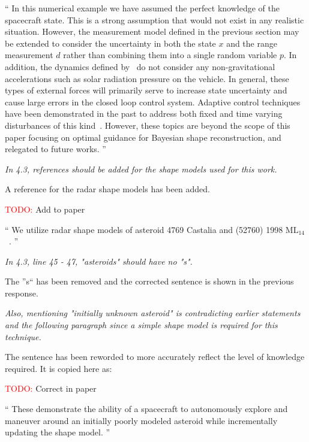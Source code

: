 \documentclass[11pt]{article}
\newcommand{\todo}{{\large \textcolor{red}{TODO: }}}
\newenvironment{correction}{\begin{list}{}{\setlength{\leftmargin}{1cm}\setlength{\rightmargin}{1cm}}\vspace{\parsep}\item[]``}{''\end{list}}
\newcommand{\comment}[1]{\item \itshape #1 \normalfont}
\begin{document}
\begin{itemize}
\begin{correction}
    In this numerical example we have assumed the perfect knowledge of the spacecraft state. 
    This is a strong assumption that would not exist in any realistic situation. 
    However, the measurement model defined in the previous section may be extended to consider the uncertainty in both the state \( x \) and the range measurement \( d \) rather than combining them into a single random variable \( p \).
    In addition, the dynamics defined by~ do not consider any non-gravitational accelerations such as solar radiation pressure on the vehicle.
    In general, these types of external forces will primarily serve to increase state uncertainty and cause large errors in the closed loop control system.
    Adaptive control techniques have been demonstrated in the past to address both fixed and time varying disturbances of this kind~\cite{kulumani2017a}.
    However, these topics are beyond the scope of this paper focusing on optimal guidance for Bayesian shape reconstruction, and relegated to future works. 
\end{correction}

\comment{
In 4.3, references should be added for the shape models used for this work.}

A reference for the radar shape models has been added.

\todo Add to paper

\begin{correction}
We utilize radar shape models of asteroid \num{4769} Castalia and (\num{52760}) \num{1998} \(\text{ML}_{14}\)~\cite{neese2004}.
\end{correction}

\comment{
In 4.3, line 45 - 47, "asteroids" should have no "s". 
}

The ''s`` has been removed and the corrected sentence is shown in the previous response.


\comment{
Also, mentioning "initially unknown asteroid" is contradicting earlier statements and the following paragraph since a simple shape model is required for this technique.
}

The sentence has been reworded to more accurately reflect the level of knowledge required.
It is copied here as:

\todo Correct in paper

\begin{correction}
These demonstrate the ability of a spacecraft to autonomously explore and maneuver around an initially poorly modeled asteroid while incrementally updating the shape model.
\end{correction}


\end{itemize}
\end{document}
